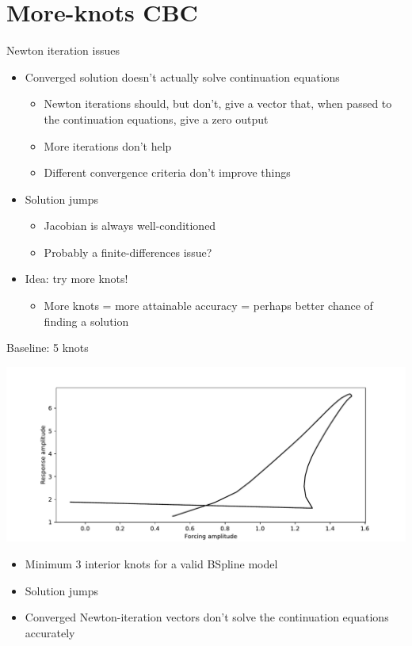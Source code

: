 \documentclass[presentation]{beamer}
\begin{document}
\section{More-knots CBC}
\label{sec:org0f96608}
\begin{frame}[label={sec:org5c0c013}]{Newton iteration issues}
\begin{itemize}
\item Converged solution doesn't actually solve continuation equations
\begin{itemize}
\item Newton iterations should, but don't, give a vector that, when passed to the continuation equations, give a zero output
\item More iterations don't help
\item Different convergence criteria don't improve things
\end{itemize}
\end{itemize}
\vfill
\begin{itemize}
\item Solution jumps
\begin{itemize}
\item Jacobian is always well-conditioned
\item Probably a finite-differences issue?
\end{itemize}
\end{itemize}
\vfill
\begin{itemize}
\item Idea: try more knots!
\begin{itemize}
\item More knots = more attainable accuracy = perhaps better chance of finding a solution
\end{itemize}
\end{itemize}
\end{frame}

\begin{frame}[label={sec:org0b37d27},plain]{Baseline: 5 knots}
\begin{center}
\includegraphics[width=.9\linewidth]{./5_knots_cbc.pdf}
\end{center}

\begin{itemize}
\item Minimum 3 interior knots for a valid BSpline model
\item Solution jumps
\item Converged Newton-iteration vectors don't solve the continuation equations accurately
\end{itemize}
\end{frame}
\end{document}
